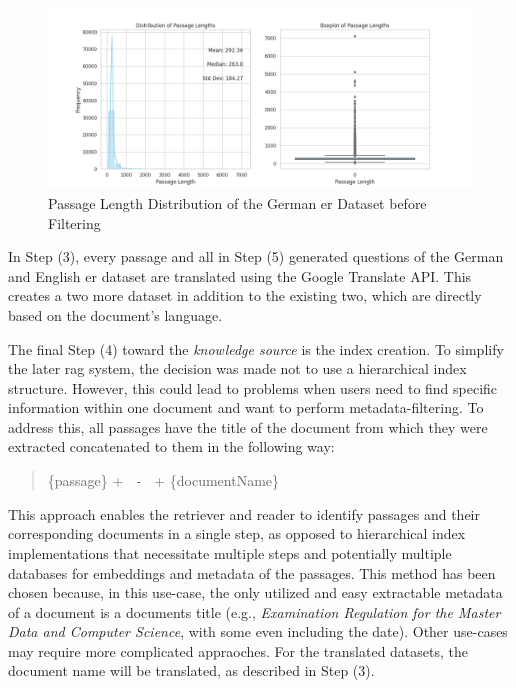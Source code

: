 \begin{figure}
    \centering
    \includegraphics[width=\textwidth]{Grafiken/Statistiken/IndexGerman_Passage_Length_Statistics_old.png}
    \caption{Passage Length Distribution of the German \gls{er} Dataset before Filtering}
    \label{fig:er-german-passage-length-old}
\end{figure}

In Step (3), every passage and all in Step (5) generated questions of the German and English \gls{er} dataset are translated using the Google Translate API. This creates a two more dataset in addition to the existing two, which are directly based on the document's language.

The final Step (4) toward the \textit{knowledge source} is the index creation. To simplify the later \gls{rag} system, the decision was made not to use a hierarchical index structure. However, this could lead to problems when users need to find specific information within one document and want to perform metadata-filtering. To address this, all passages have the title of the document from which they were extracted concatenated to them in the following way:

\begin{quotation}
    \{passage\} + \texttt{ - } + \{documentName\}
\end{quotation}

This approach enables the retriever and reader to identify passages and their corresponding documents in a single step, as opposed to hierarchical index implementations that necessitate multiple steps and potentially multiple databases for embeddings and metadata of the passages. This method has been chosen because, in this use-case, the only utilized and easy extractable metadata of a document is a documents title (e.g., \textit{Examination Regulation for the Master Data and Computer Science}, with some even including the date). Other use-cases may require more complicated appraoches. For the translated datasets, the document name will be translated, as described in Step (3).

